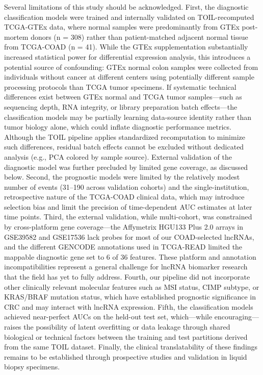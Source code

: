 \documentclass[fleqn,10pt]{wlscirep}
\begin{document}
Several limitations of this study should be acknowledged. First, the diagnostic classification models were trained and internally validated on TOIL-recomputed TCGA-GTEx data, where normal samples were predominantly from GTEx post-mortem donors (n = 308) rather than patient-matched adjacent normal tissue from TCGA-COAD (n = 41). While the GTEx supplementation substantially increased statistical power for differential expression analysis, this introduces a potential source of confounding: GTEx normal colon samples were collected from individuals without cancer at different centers using potentially different sample processing protocols than TCGA tumor specimens. If systematic technical differences exist between GTEx normal and TCGA tumor samples—such as sequencing depth, RNA integrity, or library preparation batch effects—the classification models may be partially learning data-source identity rather than tumor biology alone, which could inflate diagnostic performance metrics. Although the TOIL pipeline applies standardized recomputation to minimize such differences, residual batch effects cannot be excluded without dedicated analysis (e.g., PCA colored by sample source). External validation of the diagnostic model was further precluded by limited gene coverage, as discussed below. Second, the prognostic models were limited by the relatively modest number of events (31–190 across validation cohorts) and the single-institution, retrospective nature of the TCGA-COAD clinical data, which may introduce selection bias and limit the precision of time-dependent AUC estimates at later time points. Third, the external validation, while multi-cohort, was constrained by cross-platform gene coverage—the Affymetrix HGU133 Plus 2.0 arrays in GSE39582 and GSE17536 lack probes for most of our COAD-selected lncRNAs, and the different GENCODE annotations used in TCGA-READ limited the mappable diagnostic gene set to 6 of 36 features. These platform and annotation incompatibilities represent a general challenge for lncRNA biomarker research that the field has yet to fully address. Fourth, our pipeline did not incorporate other clinically relevant molecular features such as MSI status, CIMP subtype, or KRAS/BRAF mutation status, which have established prognostic significance in CRC and may interact with lncRNA expression. Fifth, the classification models achieved near-perfect AUCs on the held-out test set, which—while encouraging—raises the possibility of latent overfitting or data leakage through shared biological or technical factors between the training and test partitions derived from the same TOIL dataset. Finally, the clinical translatability of these findings remains to be established through prospective studies and validation in liquid biopsy specimens.
\end{document}
